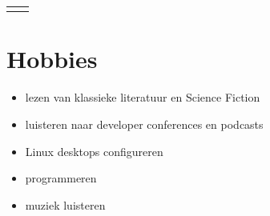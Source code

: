 \documentclass[
	11pt, %
]{FreemanCV}
\begin{document}
\begin{paracol}{2}
\begin{supertabular}{r l}

		\tableentry{}{}{}

	\end{supertabular}

	\section{Hobbies}

	\begin{itemize}
		\item lezen van klassieke literatuur en Science Fiction
		\item luisteren naar developer conferences en podcasts
		\item Linux desktops configureren
		\item programmeren
		\item muziek luisteren
	\end{itemize}







\end{paracol}
\end{document}
